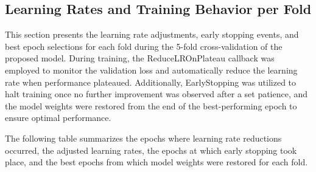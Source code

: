 \begin{table}[H]
	\centering
	\caption{Per-fold performance metrics (Batch Size: 32, Epochs: 50, Activation Function: ReLU).}
	\label{tab:per-fold}
\end{table}


\vspace{0.75cm}
\begin{minipage}{\linewidth}
	\subsection{Learning Rates and Training Behavior per Fold}
\end{minipage}

This section presents the learning rate adjustments, early stopping events, and best epoch selections for each fold during the 5-fold cross-validation of the proposed model. During training, the ReduceLROnPlateau callback was employed to monitor the validation loss and automatically reduce the learning rate when performance plateaued. Additionally, EarlyStopping was utilized to halt training once no further improvement was observed after a set patience, and the model weights were restored from the end of the best-performing epoch to ensure optimal performance.

The following table summarizes the epochs where learning rate reductions occurred, the adjusted learning rates, the epochs at which early stopping took place, and the best epochs from which model weights were restored for each fold.

